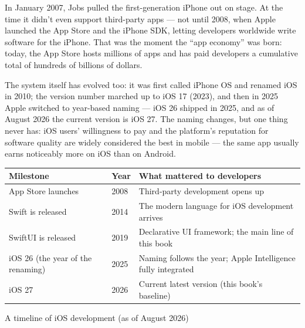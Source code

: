 


In January 2007, Jobs pulled the first-generation iPhone out on stage. At the time it didn't even support third-party apps — not until 2008, when Apple launched the App Store and the iPhone SDK, letting developers worldwide write software for the iPhone. That was the moment the “app economy” was born: today, the App Store hosts millions of apps and has paid developers a cumulative total of hundreds of billions of dollars.

The system itself has evolved too: it was first called iPhone OS and renamed iOS in 2010; the version number marched up to iOS 17 (2023), and then in 2025 Apple switched to year-based naming — iOS 26 shipped in 2025, and as of August 2026 the current version is iOS 27. The naming changes, but one thing never has: iOS users' willingness to pay and the platform's reputation for software quality are widely considered the best in mobile — the same app usually earns noticeably more on iOS than on Android.

\begin{center}
\begin{tabularx}{\linewidth}{|X|X|X|}
\hline
\textbf{Milestone} & \textbf{Year} & \textbf{What mattered to developers} \tabularnewline
\hline
App Store launches & 2008 & Third-party development opens up \tabularnewline
Swift is released & 2014 & The modern language for iOS development arrives \tabularnewline
SwiftUI is released & 2019 & Declarative UI framework; the main line of this book \tabularnewline
iOS 26 (the year of the renaming) & 2025 & Naming follows the year; Apple Intelligence fully integrated \tabularnewline
iOS 27 & 2026 & Current latest version (this book's baseline) \tabularnewline
\hline
\end{tabularx}
\end{center}

\begin{center}\small\color{gray}A timeline of iOS development (as of August 2026)\end{center}

